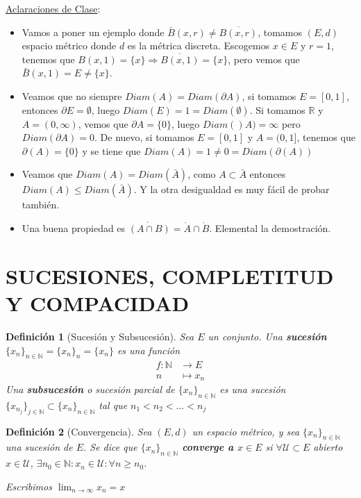 \documentclass[10pt,a4paper,openright]{book}
\theoremstyle{break}
\newtheorem*{defi}{Definición}
\begin{document}
\underline{Aclaraciones de Clase}:
\begin{itemize}
\item Vamos a poner un ejemplo donde $\bar{B}(x,r)\neq \overline{B(x,r)}$, tomamos $(E,d)$ espacio métrico donde $d$ es la métrica discreta. Escogemos $x\in E$ y $r=1$, tenemos que $B(x,1)=\{x\}\Rightarrow \overline{B(x,1)} = \{x\}$, pero vemos que $\bar{B}(x,1) = E \neq \{x\}$.

\item Veamos que no siempre $Diam(A) = Diam (\partial A)$, si tomamos $E=[0,1]$, entonces $\partial E = \emptyset$, luego $Diam (E) =1 = Diam(\emptyset)$. Si tomamos $\mathbb{R}$ y $A=(0,\infty)$, vemos que $\partial A =\{0\}$, luego $Diam()A) = \infty$ pero $Diam (\partial A) = 0$. De nuevo, si tomamos $E=[0,1]$ y $A=(0,1]$, tenemos que $\partial(A) = \{0\}$ y se tiene que $Diam(A) = 1 \neq 0 = Diam (\partial(A))$

\item Veamos que $Diam(A) = Diam (\bar{A})$, como $A\subset \bar{A}$ entonces $Diam(A) \leq Diam (\bar{A})$. Y la otra desigualdad es muy fácil de probar también.

\item Una buena propiedad es $\mathring{(A\cap B)} = \mathring{A} \cap \mathring{B}$. Elemental la demostración.
\end{itemize}

\section*{SUCESIONES, COMPLETITUD Y COMPACIDAD}

\begin{defi}[Sucesión y Subsucesión]
Sea $E$ un conjunto. Una \textbf{sucesión} $\{x_n\}_{n \in \mathbb{N}} = \{x_n\}_n = \{x_n\}$ es una función 
\begin{align*}
f : \mathbb{N} &\to E \\ n &\mapsto x_n
\end{align*}
Una \textbf{subsucesión} o sucesión parcial de $\{x_n\}_{n \in \mathbb{N}}$ es una sucesión $\{x_{n_j}\}_{j \in \mathbb{N}} \subset \{x_n\}_{n \in \mathbb{N}}$ tal que $n_1 < n_2 < \ldots < n_j$
\end{defi}

\begin{defi}[Convergencia]
Sea $(E,d)$ un espacio métrico, y sea $\{x_n\}_{n \in \mathbb{N}}$ una sucesión de $E$. Se dice que $\{x_n\}_{n \in \mathbb{N}}$ \textbf{converge a $x \in E$} si $\forall \mathcal{U} \subset E$  abierto $x\in \mathcal{U}$, $\exists n_0 \in \mathbb{N} : x_n \in \mathcal{U} : \forall n \geq n_0$. 

Escribimos $\lim_{n \to \infty} x_n = x$
\end{defi}
\end{document}
